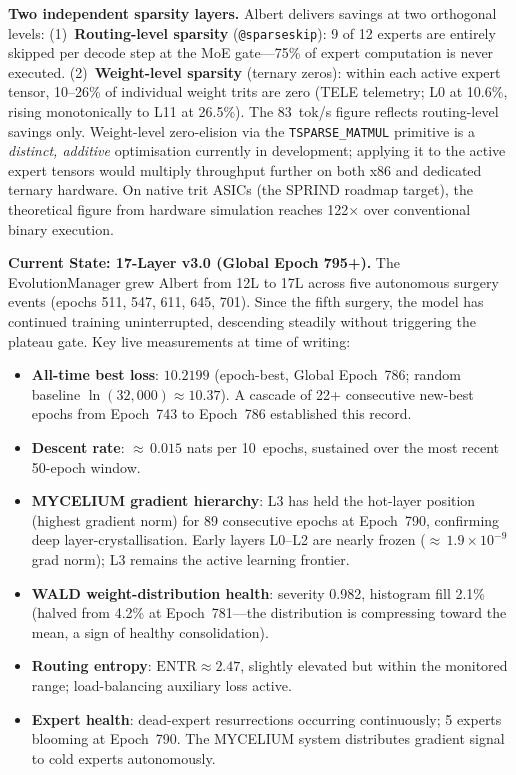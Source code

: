\documentclass[journal,10pt,twocolumn]{IEEEtran}
\begin{document}
\noindent\textbf{Two independent sparsity layers.}
Albert delivers savings at two orthogonal levels:
(1)~\textbf{Routing-level sparsity} (\texttt{@sparseskip}): 9 of 12 experts
are entirely skipped per decode step at the MoE gate---75\% of expert
computation is never executed.
(2)~\textbf{Weight-level sparsity} (ternary zeros): within each active expert
tensor, 10--26\% of individual weight trits are zero (TELE telemetry; L0 at
10.6\%, rising monotonically to L11 at 26.5\%).
The 83~tok/s figure reflects routing-level savings only.
Weight-level zero-elision via the \texttt{TSPARSE\_MATMUL} primitive is a
\emph{distinct, additive} optimisation currently in development; applying it
to the active expert tensors would multiply throughput further on both x86 and
dedicated ternary hardware. On native trit ASICs (the SPRIND roadmap target),
the theoretical figure from hardware simulation reaches 122$\times$ over
conventional binary execution.

\textbf{Current State: 17-Layer v3.0 (Global Epoch 795+).}
The EvolutionManager grew Albert from 12L to 17L across five autonomous
surgery events (epochs 511, 547, 611, 645, 701). Since the fifth surgery,
the model has continued training uninterrupted, descending steadily without
triggering the plateau gate. Key live measurements at time of writing:

\begin{itemize}
  \item \textbf{All-time best loss}: $10.2199$ (epoch-best, Global Epoch~786;
        random baseline $\ln(32{,}000) \approx 10.37$). A cascade of 22+
        consecutive new-best epochs from Epoch~743 to Epoch~786 established
        this record.
  \item \textbf{Descent rate}: ${\approx}\,0.015$ nats per 10~epochs,
        sustained over the most recent 50-epoch window.
  \item \textbf{MYCELIUM gradient hierarchy}: L3 has held the hot-layer
        position (highest gradient norm) for 89 consecutive epochs at
        Epoch~790, confirming deep layer-crystallisation. Early layers
        L0--L2 are nearly frozen (${\approx}\,1.9 \times 10^{-9}$ grad
        norm); L3 remains the active learning frontier.
  \item \textbf{WALD weight-distribution health}: severity 0.982,
        histogram fill 2.1\% (halved from 4.2\% at Epoch~781---the
        distribution is compressing toward the mean, a sign of healthy
        consolidation).
  \item \textbf{Routing entropy}: $\text{ENTR} \approx 2.47$, slightly
        elevated but within the monitored range; load-balancing auxiliary
        loss active.
  \item \textbf{Expert health}: dead-expert resurrections occurring
        continuously; 5 experts blooming at Epoch~790. The MYCELIUM
        system distributes gradient signal to cold experts autonomously.
\end{itemize}
\end{document}
